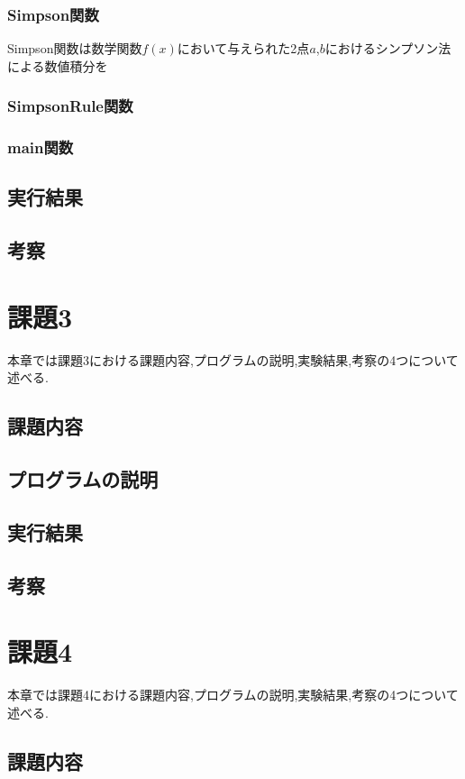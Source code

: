 \documentclass[dvipdfmx]{jarticle}
\begin{document}
    \subsubsection{Simpson関数}
    Simpson関数は数学関数$f(x)$において与えられた2点$a$,$b$におけるシンプソン法による数値積分を
    \subsubsection{SimpsonRule関数}
    \subsubsection{main関数}


    \subsection{実行結果}
    \subsection{考察}

    \section{課題3}
    本章では課題3における課題内容,プログラムの説明,実験結果,考察の4つについて述べる.
    \subsection{課題内容}
    \subsection{プログラムの説明}
    \subsection{実行結果}
    \subsection{考察}

    \section{課題4}
    本章では課題4における課題内容,プログラムの説明,実験結果,考察の4つについて述べる.
    \subsection{課題内容}
\end{document}
